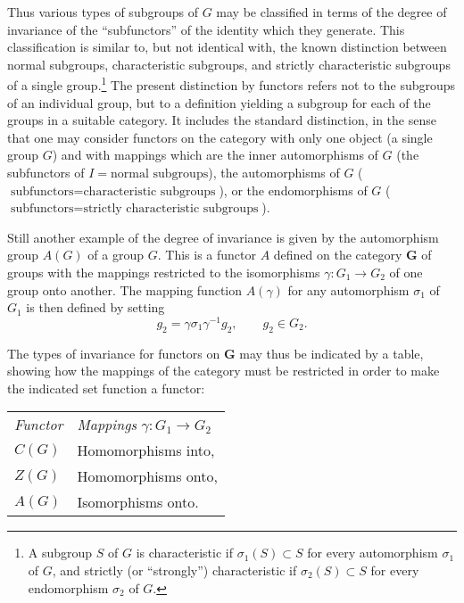 \documentclass[11pt,a4paper]{report}
\begin{document}
Thus various types of subgroups of $G$ may be classified in terms of the degree of invariance of the
``subfunctors'' of the identity which they generate. This classification is similar to, but not 
identical with, the known distinction between normal subgroups, characteristic subgroups, and strictly
characteristic subgroups of a single group.\footnote{A subgroup $S$ of $G$ is characteristic if 
$\sigma_1(S)\subset S$ for every automorphism $\sigma_1$ of $G$, and strictly (or ``strongly'') characteristic
if $\sigma_2(S)\subset S$ for every endomorphism $\sigma_2$ of $G$.} The present distinction by functors
refers not to the subgroups of an individual group, but to a definition yielding a subgroup for each
of the groups in a suitable category. It includes the standard distinction, in the sense that one may
consider functors on the category with only one object (a single group $G$) and with mappings which are
the inner automorphisms of $G$ (the subfunctors of $I=\text{normal subgroups}$), the automorphisms of
$G$ ($\text{subfunctors}=\text{characteristic subgroups}$), or the endomorphisms of $G$ ($\text{subfunctors}
=\text{strictly characteristic subgroups}$).

Still another example of the degree of invariance is given by the automorphism group $A(G)$ of a group $G$.
This is a functor $A$ defined on the category $\mathbf{G}$ of groups with the mappings restricted to the
isomorphisms $\gamma:G_1\rightarrow G_2$ of one group onto another. The mapping function $A(\gamma)$ for any
automorphism $\sigma_1$ of $G_1$ is then defined by setting
\begin{equation*}
	[A(\gamma)\sigma_1]g_2 =  \gamma\sigma_1\gamma^{-1}g_2,\qquad g_2\in G_2.
\end{equation*}

The types of invariance for functors on $\mathbf{G}$ may thus be indicated by a table, showing how the mappings
of the category must be restricted in order to make the indicated set function a functor:
\begin{center}
	\begin{tabular}{l l}
	\textit{Functor} & \textit{Mappings} $\gamma:G_1\rightarrow G_2$\\
	$C(G)$	& Homomorphisms into,\\
	$Z(G)$	& Homomorphisms onto,\\
	$A(G)$	& Isomorphisms onto.\\
	\end{tabular}
\end{center}
\end{document}
